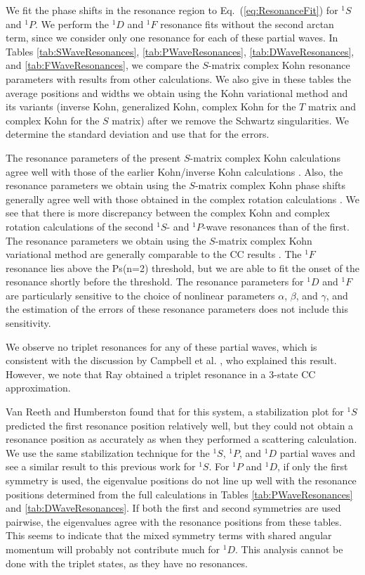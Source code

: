 \documentclass[preprint,showpacs,showkeys,preprintnumbers,amsmath,amssymb,longbibliography,pra,aps]{revtex4-1}
\begin{document}
We fit the phase shifts in the resonance region to Eq.~(\ref{eq:ResonanceFit})
for $^1S$ and $^1P$. We perform the $^1D$ and $^1F$ resonance fits without 
the second arctan term, since we consider only
one resonance for each of these partial waves. In 
Tables \ref{tab:SWaveResonances}, \ref{tab:PWaveResonances},
\ref{tab:DWaveResonances}, and \ref{tab:FWaveResonances}, we compare the
$S$-matrix complex Kohn resonance parameters with results from other
calculations. We also give in these tables the average positions and widths
we obtain using the Kohn variational method and its variants
(inverse Kohn, generalized Kohn, complex Kohn for the $T$ matrix and complex 
Kohn for the
$S$ matrix) after we remove the Schwartz singularities. We determine the 
standard deviation and use that for the errors.

The resonance parameters of the present $S$-matrix complex Kohn calculations
agree well with those of the earlier Kohn/inverse Kohn calculations
\cite{VanReeth2004}. Also, the resonance parameters we obtain using the
$S$-matrix complex Kohn phase shifts generally agree well with those obtained
in the complex rotation calculations \cite{Yan1999,Yan1998a,Ho1998,Ho2000}.
We see that there is more discrepancy between the complex Kohn and complex
rotation calculations \cite{Yan1999,Yan1998a} of the second
$^1S$- and $^1P$-wave resonances than of the first. The resonance parameters
we obtain using the $S$-matrix complex Kohn variational method
are generally comparable to the CC results \cite{Walters2004}.
The $^1F$ resonance lies above the Ps(n=2) threshold, but we are able to
fit the onset of the resonance shortly before the threshold.
The resonance parameters for $^1D$ and $^1F$ are particularly
sensitive to the choice of nonlinear parameters $\alpha$, $\beta$, and $\gamma$,
and the estimation of the errors of these resonance parameters does not include
this sensitivity.

We observe no triplet resonances for any of these partial waves, which 
is consistent with the discussion by Campbell et al. \cite{Campbell1998}, 
who explained this result.
However, we note that Ray \cite{Ray2006} obtained a triplet resonance in a
3-state CC approximation.

Van Reeth and Humberston \cite{VanReeth2004} found that for this 
system, a stabilization plot for $^1S$ predicted the first resonance position
relatively well, but they could not obtain a resonance position as accurately as when
they performed a scattering calculation. We use the same stabilization
technique for the $^1S$,
$^1P$, and $^1D$ partial waves and see a similar result to this previous work 
for $^1S$. For $^1P$ and $^1D$, if only the first symmetry is used, the 
eigenvalue positions do not line up well with the resonance positions 
determined from the full calculations in Tables \ref{tab:PWaveResonances} and 
\ref{tab:DWaveResonances}. If both the first and second symmetries are used 
pairwise, the eigenvalues agree with the resonance positions from these 
tables. This seems to indicate that the mixed symmetry terms with shared 
angular momentum will probably not contribute much for $^1D$. This analysis
cannot be done with the triplet states, as they have no resonances.
\end{document}
